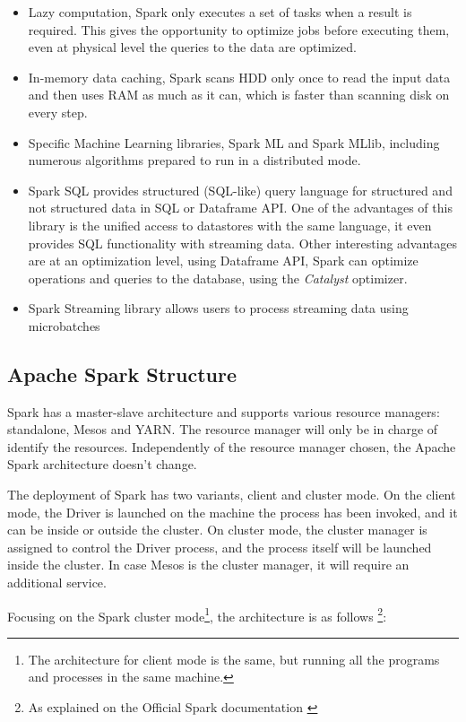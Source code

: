 \documentclass[11pt]{book} %
\begin{document}
    \begin{itemize}
      \item Lazy computation, Spark only executes a set of tasks when a result is required. This gives the opportunity to optimize jobs before executing them, even at physical level the queries to the data are optimized.
      \item In-memory data caching, Spark scans HDD only once to read the input data and then uses RAM as much as it can, which is faster than scanning disk on every step.
      \item Specific Machine Learning libraries, Spark ML and Spark MLlib, including numerous algorithms prepared to run in a distributed mode.
      \item Spark SQL provides structured (SQL-like) query language for structured and not structured data in SQL or Dataframe API. One of the advantages of this library is the unified access to datastores with the same language, it even provides SQL functionality with streaming data. Other interesting advantages are at an optimization level, using Dataframe API, Spark can optimize operations and queries to the database, using the \emph{Catalyst} optimizer.
      \item Spark Streaming library allows users to process streaming data using microbatches
    \end{itemize}

    \subsection{Apache Spark Structure}

      Spark has a master-slave architecture and supports various resource managers: standalone, Mesos and YARN. The resource manager will only be in charge of identify the resources. Independently of the resource manager chosen, the Apache Spark architecture doesn't change.

      The deployment of Spark has two variants, client and cluster mode. On the client mode, the Driver is launched on the machine the process has been invoked, and it can be inside or outside the cluster. On cluster mode, the cluster manager is assigned to control the Driver process, and the process itself will be launched inside the cluster. In case Mesos is the cluster manager, it will require an additional service.

      Focusing on the Spark cluster mode\footnote{The architecture for client mode is the same, but running all the programs and processes in the same machine.}, the architecture is as follows \footnote{As explained on the Official Spark documentation \cite{spark_documentation}}:
\end{document}
